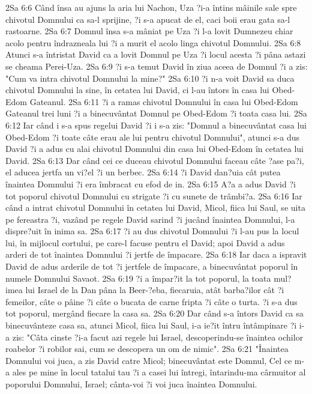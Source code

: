 2Sa 6:6  Când însa au ajuns la aria lui Nachon, Uza ?i-a întins mâinile sale spre chivotul Domnului ca sa-l sprijine, ?i s-a apucat de el, caci boii erau gata sa-l rastoarne.
2Sa 6:7  Domnul însa s-a mâniat pe Uza ?i l-a lovit Dumnezeu chiar acolo pentru îndrazneala lui ?i a murit el acolo linga chivotul Domnului.
2Sa 6:8  Atunci s-a întristat David ca a lovit Domnul pe Uza ?i locul acesta ?i pâna astazi se cheama Perei-Uza.
2Sa 6:9  ?i s-a temut David în ziua aceea de Domnul ?i a zis: "Cum va intra chivotul Domnului la mine?"
2Sa 6:10  ?i n-a voit David sa duca chivotul Domnului la sine, în cetatea lui David, ci l-au întors în casa lui Obed-Edom Gateanul.
2Sa 6:11  ?i a ramas chivotul Domnului în casa lui Obed-Edom Gateanul trei luni ?i a binecuvântat Domnul pe Obed-Edom ?i toata casa lui.
2Sa 6:12  Iar când i s-a spus regelui David ?i i s-a zis: "Domnul a binecuvântat casa lui Obed-Edom ?i toate câte erau ale lui pentru chivotul Domnului", atunci s-a dus David ?i a adus cu alai chivotul Domnului din casa lui Obed-Edom în cetatea lui David.
2Sa 6:13  Dar când cei ce duceau chivotul Domnului faceau câte ?ase pa?i, el aducea jertfa un vi?el ?i un berbec.
2Sa 6:14  ?i David dan?uia cât putea înaintea Domnului ?i era îmbracat cu efod de in.
2Sa 6:15  A?a a adus David ?i tot poporul chivotul Domnului cu strigate ?i cu sunete de trâmbi?a.
2Sa 6:16  Iar când a intrat chivotul Domnului în cetatea lui David, Micol, fiica lui Saul, se uita pe fereastra ?i, vazând pe regele David sarind ?i jucând înaintea Domnului, l-a dispre?uit în inima sa.
2Sa 6:17  ?i au dus chivotul Domnului ?i l-au pus la locul lui, în mijlocul cortului, pe care-l facuse pentru el David; apoi David a adus arderi de tot înaintea Domnului ?i jertfe de împacare.
2Sa 6:18  Iar daca a ispravit David de adus arderile de tot ?i jertfele de împacare, a binecuvântat poporul în numele Domnului Savaot.
2Sa 6:19  ?i a împar?it la tot poporul, la toata mul?imea lui Israel de la Dan pâna la Beer-?eba, fiecaruia, atât barba?ilor cât ?i femeilor, câte o pâine ?i câte o bucata de carne fripta ?i câte o turta. ?i s-a dus tot poporul, mergând fiecare la casa sa.
2Sa 6:20  Dar când s-a întors David ca sa binecuvânteze casa sa, atunci Micol, fiica lui Saul, i-a ie?it întru întâmpinare ?i i-a zis: "Câta cinste ?i-a facut azi regele lui Israel, descoperindu-se înaintea ochilor roabelor ?i robilor sai, cum se descopera un om de nimic".
2Sa 6:21  "Înaintea Domnului voi juca, a zis David catre Micol; binecuvântat este Domnul, Cel ce m-a ales pe mine în locul tatalui tau ?i a casei lui întregi, întarindu-ma cârmuitor al poporului Domnului, Israel; cânta-voi ?i voi juca înaintea Domnului.
